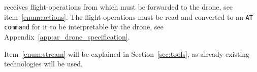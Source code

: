  receives flight-operations from  which must be forwarded to the drone, see item~\ref{enum:actions}.
The flight-operations must be read and converted to an \verb+AT command+ for it to be interpretable by the drone, see Appendix~\ref{app:ar_drone_specification}.

Item~\ref{enum:stream} will be explained in Section~\ref{sec:tools}, as already existing technologies will be used.









